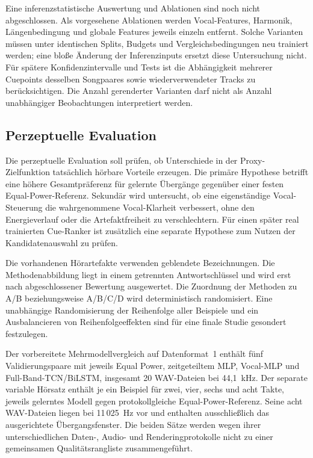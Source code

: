 Eine inferenzstatistische Auswertung und Ablationen sind noch nicht abgeschlossen. Als vorgesehene Ablationen werden Vocal-Features, Harmonik, Längenbedingung und globale Features jeweils einzeln entfernt. Solche Varianten müssen unter identischen Splits, Budgets und Vergleichsbedingungen neu trainiert werden; eine bloße Änderung der Inferenzinputs ersetzt diese Untersuchung nicht. Für spätere Konfidenzintervalle und Tests ist die Abhängigkeit mehrerer Cuepoints desselben Songpaares sowie wiederverwendeter Tracks zu berücksichtigen. Die Anzahl gerenderter Varianten darf nicht als Anzahl unabhängiger Beobachtungen interpretiert werden.

\subsection{Perzeptuelle Evaluation}
\label{sec:methodik-hoerstudie}

Die perzeptuelle Evaluation soll prüfen, ob Unterschiede in der Proxy-Zielfunktion tatsächlich hörbare Vorteile erzeugen. Die primäre Hypothese betrifft eine höhere Gesamtpräferenz für gelernte Übergänge gegenüber einer festen Equal-Power-Referenz. Sekundär wird untersucht, ob eine eigenständige Vocal-Steuerung die wahrgenommene Vocal-Klarheit verbessert, ohne den Energieverlauf oder die Artefaktfreiheit zu verschlechtern. Für einen später real trainierten Cue-Ranker ist zusätzlich eine separate Hypothese zum Nutzen der Kandidatenauswahl zu prüfen.

Die vorhandenen Hörartefakte verwenden geblendete Bezeichnungen. Die Methodenabbildung liegt in einem getrennten Antwortschlüssel und wird erst nach abgeschlossener Bewertung ausgewertet. Die Zuordnung der Methoden zu A/B beziehungsweise A/B/C/D wird deterministisch randomisiert. Eine unabhängige Randomisierung der Reihenfolge aller Beispiele und ein Ausbalancieren von Reihenfolgeeffekten sind für eine finale Studie gesondert festzulegen.

Der vorbereitete Mehrmodellvergleich auf Datenformat~1 enthält fünf Validierungspaare mit jeweils Equal Power, zeitgeteiltem MLP, Vocal-MLP und Full-Band-TCN/BiLSTM, insgesamt 20 WAV-Dateien bei 44,1~kHz. Der separate variable Hörsatz enthält je ein Beispiel für zwei, vier, sechs und acht Takte, jeweils gelerntes Modell gegen protokollgleiche Equal-Power-Referenz. Seine acht WAV-Dateien liegen bei 11\,025~Hz vor und enthalten ausschließlich das ausgerichtete Übergangsfenster. Die beiden Sätze werden wegen ihrer unterschiedlichen Daten-, Audio- und Renderingprotokolle nicht zu einer gemeinsamen Qualitätsrangliste zusammengeführt.

